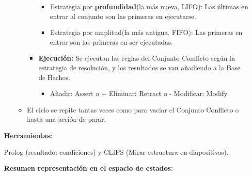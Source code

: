 \documentclass[12pt, twoside, openright]{report} %
\begin{document}
\begin{itemize}
\begin{itemize}
\begin{itemize}
        \begin{itemize}
        \item Estrategia por \textbf{profundidad}(la más nueva, LIFO): Las
          últimas en entrar al conjunto son las primeras en ejecutarse.
          
        \item Estrategia por amplitud(la más antigua, FIFO): Las primeras en
          entrar son las primeras en ser ejecutadas.
          
        \end{itemize}
      \item \textbf{Ejecución:} Se ejecutan las reglas del Conjunto
        Conflicto según la estrategia de resolución, y los resultados se
        van añadiendo a la Base de Hechos.
        

        \begin{itemize}
        \item Añadir: Assert o + Eliminar\textbf{:} Retract o - Modificar:
          Modify
          
        \end{itemize}
      \end{itemize}
    \item El ciclo se repite tantas veces como para vaciar el Conjunto
      Conflicto o hasta una acción de parar.
      
    \end{itemize}
  \end{itemize}

 
  \textbf{Herramientas:} 
  
  Prolog (resultado:-condiciones) y CLIPS (Mirar
  estructura en diapositivas).
  

 \pagebreak
  \textbf{Resumen representación en el espacio de estados:}
  
\end{document}

